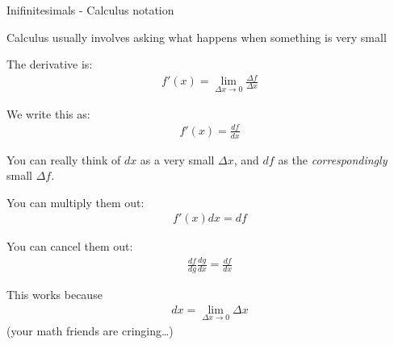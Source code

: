 \documentclass[aspectratio=169,
hyperref={colorlinks,urlcolor=blue}
]{beamer}
\begin{document}
\begin{bulletframe}{Inifinitesimals - Calculus notation}
\scriptsize
\item Calculus usually involves asking what happens when something is very small
\item The derivative is:
\begin{align*}
f'(x) =\lim_{\Delta x\to 0}\frac{\Delta f}{\Delta x}
\end{align*}
\item We write this as:
\begin{align*}
f'(x) =\frac{df}{dx}
\end{align*}
\item You can really think of $dx$ as a very small $\Delta x$, and $df$ as the \emph{correspondingly} small $\Delta f$.
\item You can multiply them out:
\begin{align*}
f'(x) dx=df
\end{align*}
\item You can cancel them out:
\begin{align*}
\frac{df}{dg}\frac{dg}{dx}=\frac{df}{dx}
\end{align*}
\item This works because 
\begin{align*}
dx=\lim_{\Delta x\to 0} \Delta x
\end{align*}
(your math friends are cringing…) 
\end{bulletframe}


\end{document}
